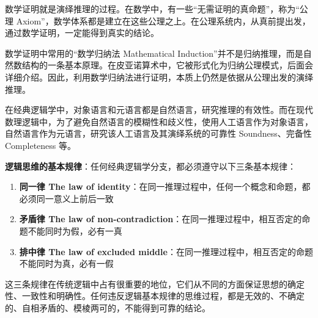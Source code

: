 \begin{remark}
    数学证明就是演绎推理的过程。在数学中，有一些“无需证明的真命题”，称为“公理 Axiom”，数学体系都是建立在这些公理之上。在公理系统内，从真前提出发，通过数学证明，一定能得到真实的结论。
\end{remark}

\begin{remark}
    数学证明中常用的“数学归纳法 Mathematical Induction”并不是归纳推理，而是自然数结构的一条基本原理。在皮亚诺算术中，它被形式化为归纳公理模式，后面会详细介绍。因此，利用数学归纳法进行证明，本质上仍然是依据从公理出发的演绎推理。
\end{remark}

\begin{remark}
    在经典逻辑学中，对象语言和元语言都是自然语言，研究推理的有效性。而在现代数理逻辑中，为了避免自然语言的模糊性和歧义性，使用人工语言作为对象语言，自然语言作为元语言，研究该人工语言及其演绎系统的可靠性 Soundness、完备性 Completeness 等。
\end{remark}

\vspace{1em}
\textbf{逻辑思维的基本规律}：任何经典逻辑学分支，都必须遵守以下三条基本规律：
\begin{enumerate}
    \item \textbf{同一律 The law of identity}：在同一推理过程中，任何一个概念和命题，都必须同一意义上前后一致
    \item \textbf{矛盾律 The law of non-contradiction}：在同一推理过程中，相互否定的命题不能同时为假，必有一真
    \item \textbf{排中律 The law of excluded middle}：在同一推理过程中，相互否定的命题不能同时为真，必有一假
\end{enumerate}

\begin{remark}
    这三条规律在传统逻辑中占有很重要的地位，它们从不同的方面保证思想的确定性、一致性和明确性。任何违反逻辑基本规律的思维过程，都是无效的、不确定的、自相矛盾的、模棱两可的，不能得到可靠的结论。
\end{remark}
